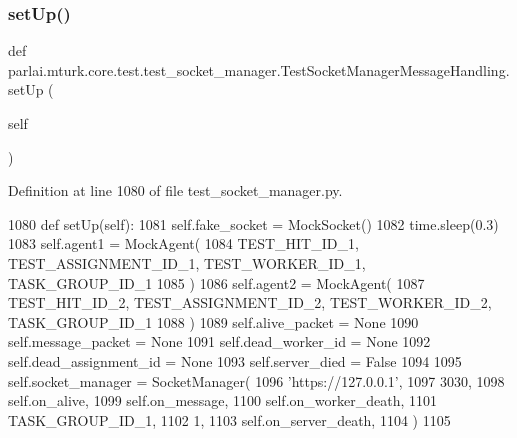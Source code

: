\subsubsection{\texorpdfstring{set\+Up()}{setUp()}}
{\footnotesize\ttfamily def parlai.\+mturk.\+core.\+test.\+test\+\_\+socket\+\_\+manager.\+Test\+Socket\+Manager\+Message\+Handling.\+set\+Up (\begin{DoxyParamCaption}\item[{}]{self }\end{DoxyParamCaption})}



Definition at line 1080 of file test\+\_\+socket\+\_\+manager.\+py.


\begin{DoxyCode}
1080     \textcolor{keyword}{def }setUp(self):
1081         self.fake\_socket = MockSocket()
1082         time.sleep(0.3)
1083         self.agent1 = MockAgent(
1084             TEST\_HIT\_ID\_1, TEST\_ASSIGNMENT\_ID\_1, TEST\_WORKER\_ID\_1, TASK\_GROUP\_ID\_1
1085         )
1086         self.agent2 = MockAgent(
1087             TEST\_HIT\_ID\_2, TEST\_ASSIGNMENT\_ID\_2, TEST\_WORKER\_ID\_2, TASK\_GROUP\_ID\_1
1088         )
1089         self.alive\_packet = \textcolor{keywordtype}{None}
1090         self.message\_packet = \textcolor{keywordtype}{None}
1091         self.dead\_worker\_id = \textcolor{keywordtype}{None}
1092         self.dead\_assignment\_id = \textcolor{keywordtype}{None}
1093         self.server\_died = \textcolor{keyword}{False}
1094 
1095         self.socket\_manager = SocketManager(
1096             \textcolor{stringliteral}{'https://127.0.0.1'},
1097             3030,
1098             self.on\_alive,
1099             self.on\_message,
1100             self.on\_worker\_death,
1101             TASK\_GROUP\_ID\_1,
1102             1,
1103             self.on\_server\_death,
1104         )
1105 
\end{DoxyCode}
\mbox{\label{classparlai_1_1mturk_1_1core_1_1test_1_1test__socket__manager_1_1TestSocketManagerMessageHandling_ac55d47400950c3c6dda879fe4548fe4f}} 
